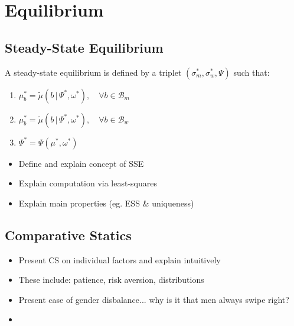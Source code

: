 \section{Equilibrium}
\subsection{Steady-State Equilibrium}
\begin{definition}
    A steady-state equilibrium is defined by a triplet $(\sigma^*_m, \sigma^*_w, \Psi)$ such that:
    \begin{enumerate}
        \item $\mu^*_b = \widetilde\mu(b\,|\,\Psi^*,\omega^*), \quad \forall b \in \mathcal{B}_m$
        \item $\mu^*_b = \widetilde\mu(b\,|\,\Psi^*,\omega^*), \quad \forall b \in \mathcal{B}_w$
        \item $\Psi^* = \Psi(\mu^*,\omega^*)$
    \end{enumerate} 
\end{definition}
\begin{itemize}
    \item Define and explain concept of SSE
    \item Explain computation via least-squares
    \item Explain main properties (eg. ESS \& uniqueness)
\end{itemize} 
\subsection{Comparative Statics} 
\begin{itemize}
    \item Present CS on individual factors and explain intuitively
    \item These include: patience, risk aversion, distributions  
    \item Present case of gender disbalance... why is it that men always swipe right?
    \item 
\end{itemize} 